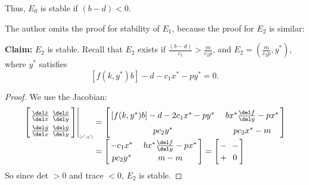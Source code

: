 \documentclass[a5paper]{article}
\theoremstyle{definition}%
\numberwithin{exercise}{section}
\theoremstyle{remark}%
\begin{document}
Thus, $E_0$ is stable if $(b-d)<0$. 

The author omits the proof for stability of $E_1$, because the proof for $E_2$ is similar:


\textbf{Claim:} $E_2$ is stable. Recall that $E_2$ exists if  $\frac{(b-d)}{c_1}>\frac{m}{c_2p}$, and $E_2=\left(\frac{m}{c_2p}, y^*\right)$, where $y^*$ satisfies 
$$[f(k,y^*)b]-d-c_1x^*-py^*=0.$$
\begin{proof}
We use the Jacobian:
\[
\arraycolsep=1.4pt\def\arraystretch{1.5}
\begin{array}{rcl}
	\left.\left[\arraycolsep=1.4pt\def\arraystretch{1.5}
	\begin{array}{cc}
		\frac{\del \dot{x}}{\del x} & \frac{\del \dot{x}}{\del y}\\
		\frac{\del \dot{y}}{\del x} & \frac{\del \dot{y}}{\del y}\\
	\end{array}\right]\right|_{\scalebox{.5}{$(x^*,y^*)$}}
	&=&
	\left[\arraycolsep=1.4pt\def\arraystretch{1.5}
	\begin{array}{cc}
		[f(k,y^*)b]-d-2c_1x^*-py^* & \quad bx^*\frac{\del f}{\del y}-px^*\\
		pc_2y^* & \quad pc_2x^*-m\\
	\end{array}\right]
	\\
	&=&	
	\left[\arraycolsep=1.4pt\def\arraystretch{1.2}
	\begin{array}{cc}
		-c_1x^* &  \quad bx^*\frac{\del f}{\del y}-px^*\\
		pc_2y^* & \quad m-m\\
	\end{array}\right]
	=
	\left[\arraycolsep=1.4pt\def\arraystretch{1.2}
	\begin{array}{cc}
		- & \,\,-\\
		+ & \,\,0\\
	\end{array}\right]		
\end{array}	
\]
So since det $>0$ and trace $<0$, $E_2$ is stable. 
\end{proof}

\end{document}
